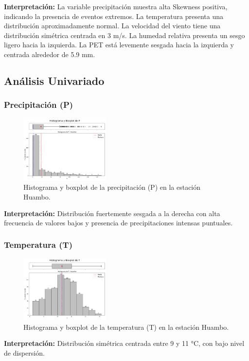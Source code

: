 \textbf{Interpretación:} La variable precipitación muestra alta Skewness positiva, indicando la presencia de eventos extremos. La temperatura presenta una distribución aproximadamente normal. La velocidad del viento tiene una distribución simétrica centrada en 3 m/s. La humedad relativa presenta un sesgo ligero hacia la izquierda. La PET está levemente sesgada hacia la izquierda y centrada alrededor de 5.9 mm.

\subsection{Análisis Univariado}

\subsubsection*{Precipitación (P)}
\begin{figure}[H]
\centering
\includegraphics[width=0.4\textwidth]{resultados/por_estacion_meteorologica/Huambo/P_histograma.png}
\caption{Histograma y boxplot de la precipitación (P) en la estación Huambo.}
\label{fig:huambo_P}
\end{figure}
\textbf{Interpretación:} Distribución fuertemente sesgada a la derecha con alta frecuencia de valores bajos y presencia de precipitaciones intensas puntuales.

\subsubsection*{Temperatura (T)}
\begin{figure}[H]
\centering
\includegraphics[width=0.4\textwidth]{resultados/por_estacion_meteorologica/Huambo/T_histograma.png}
\caption{Histograma y boxplot de la temperatura (T) en la estación Huambo.}
\label{fig:huambo_T}
\end{figure}
\textbf{Interpretación:} Distribución simétrica centrada entre 9 y 11 °C, con bajo nivel de dispersión.

